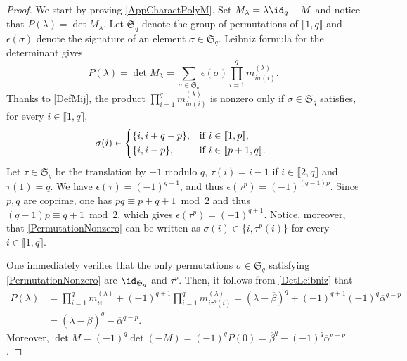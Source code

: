 \begin{proof}
We start by proving \eqref{AppCharactPolyM}. Set $M_\lambda = \lambda \id_q - M$ and notice that $P(\lambda) = \det M_\lambda$. Let $\mathfrak S_q$ denote the group of permutations of $\llbracket 1, q\rrbracket$ and $\epsilon(\sigma)$ denote the signature of an element $\sigma \in \mathfrak S_q$. Leibniz formula for the determinant gives
\begin{equation}
\label{DetLeibniz}
P(\lambda) = \det M_\lambda = \sum_{\sigma \in \mathfrak S_q} \epsilon(\sigma) \prod_{i=1}^q m_{i \sigma(i)}^{(\lambda)}.
\end{equation}
Thanks to \eqref{DefMij}, the product $\prod_{i=1}^q m_{i \sigma(i)}^{(\lambda)}$ is nonzero only if $\sigma \in \mathfrak S_q$ satisfies, for every $i \in \llbracket 1, q\rrbracket$,
\begin{equation}
\label{PermutationNonzero}
\sigma(i) \in
\begin{dcases*}
\{i, i + q - p\}, & if $i \in \llbracket 1, p\rrbracket$, \\
\{i, i - p\}, & if $i \in \llbracket p+1, q\rrbracket$.
\end{dcases*}
\end{equation}
Let $\tau \in \mathfrak S_q$ be the translation by $-1$ modulo $q$, \ie $\tau(i) = i - 1$ if $i \in \llbracket 2, q\rrbracket$ and $\tau(1) = q$. We have $\epsilon(\tau) = (-1)^{q-1}$, and thus $\epsilon(\tau^p) = (-1)^{(q-1)p}$. Since $p, q$ are coprime, one has $pq \equiv p + q + 1 \bmod 2$ and thus $(q-1)p \equiv q+1 \bmod 2$, which gives $\epsilon(\tau^p) = (-1)^{q+1}$. Notice, moreover, that \eqref{PermutationNonzero} can be written as $\sigma(i) \in \{i, \tau^p(i)\}$ for every $i \in \llbracket 1, q\rrbracket$.

One immediately verifies that the only permutations $\sigma \in \mathfrak S_q$ satisfying \eqref{PermutationNonzero} are $\id_{\mathfrak S_q}$ and $\tau^p$. Then, it follows from \eqref{DetLeibniz} that
\begin{align*}
P(\lambda) &= \prod_{i=1}^q m_{ii}^{(\lambda)} + (-1)^{q+1} \prod_{i=1}^q m_{i \tau^p(i)}^{(\lambda)} = \left(\lambda - \overline\beta\right)^q + (-1)^{q+1} (-1)^q \overline\alpha^{q - p}\\
& = \left(\lambda - \overline\beta\right)^q - \overline\alpha^{q - p}.
\end{align*}
Moreover, $\det M = (-1)^q \det(-M) = (-1)^q P(0) = \overline\beta^q - (-1)^q \overline\alpha^{q - p}$.


\end{proof}
